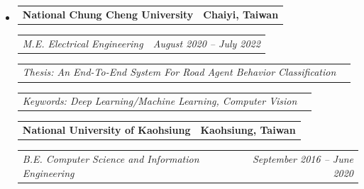 \documentclass[11pt,letterpaper]{article}
\makeatletter
\newcommand{\headerrow}[2]
{\begin{tabular*}{\linewidth}{l@{\extracolsep{\fill}}r}
#1 &
#2 \\
\end{tabular*}}
\makeatother
\begin{document}
\begin{itemize}[leftmargin=1em]
	\parskip=0.1em
		
	\item
	      \headerrow
	      {\textbf{National Chung Cheng University}}
	      {\textbf{Chaiyi, Taiwan}}
	      \headerrow
	      {\emph{M.E. Electrical Engineering} %
            }
	      {\emph{August 2020 -- July 2022}}
            \headerrow
            {\emph{Thesis: An End-To-End System For Road Agent Behavior Classification}}
            {\emph{}}
            \headerrow
            {\emph{Keywords: Deep Learning/Machine Learning, Computer Vision}}
            {\emph{}}
          
	      \headerrow
            {\textbf{National University of Kaohsiung}}
	      {\textbf{Kaohsiung, Taiwan}}
            \headerrow
	      {\emph{B.E. Computer Science and Information Engineering} %
            }
	      {\emph{September 2016 -- June 2020}}
	      	      
\end{itemize}

		
          
	      	      
\end{document}
